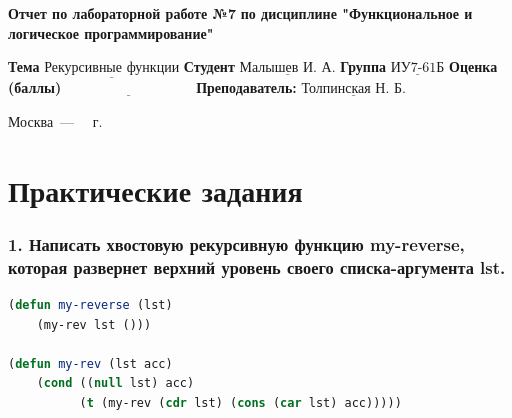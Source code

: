 \documentclass[12pt]{report}
\begin{document}
\begin{titlepage}
	
	\begin{center}
		\noindent\begin{minipage}{1.3\textwidth}\centering
			\Large\textbf{  Отчет по лабораторной работе №7}\newline
			\textbf{по дисциплине \newline "Функциональное и логическое программирование"}\newline\newline
		\end{minipage}
	\end{center}
	
	\noindent\textbf{Тема} $\underline{\text{Рекурсивные функции}}$\newline\newline
	\noindent\textbf{Студент} $\underline{\text{Малышев И. А.}}$\newline\newline
	\noindent\textbf{Группа} $\underline{\text{ИУ7-61Б}}$\newline\newline
	\noindent\textbf{Оценка (баллы)} $\underline{\text{~~~~~~~~~~~~~~~~~~~~~~~~~~~}}$\newline\newline
	\noindent\textbf{Преподаватель: } $\underline{\text{Толпинская Н. Б.}}$\newline\newline\newline
	
	\begin{center}
		\vfill
		Москва~---~\the\year
		~г.
	\end{center}
\end{titlepage}


\setcounter{page}{2}

\chapter*{Практические задания}

\subsection*{1. Написать хвостовую рекурсивную функцию my-reverse, которая развернет верхний
	уровень своего списка-аргумента lst.}

\begin{lstlisting}[label=6xd, caption=Решение задания №1, language=lisp]
(defun my-reverse (lst)
	(my-rev lst ()))
	
(defun my-rev (lst acc)
	(cond ((null lst) acc)
		  (t (my-rev (cdr lst) (cons (car lst) acc)))))

\end{lstlisting}
\end{document}
